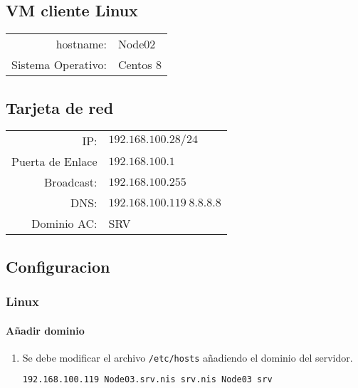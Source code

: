 \documentclass[../main.tex]{subfiles}
\begin{document}
\subsection{VM cliente Linux}\label{sec:cliente_vmlinux}
\begin{table}[htbp]
  \centering
  \begin{tabular}{rl}
    
    hostname:&Node02\\
    Sistema Operativo:&Centos 8\\
  \end{tabular}
\end{table}

\subsection{Tarjeta de red}\label{sec:ctr}
\begin{table}[htbp]
  \centering
  \begin{tabular}{rl}
    
    IP:&$192.168.100.28/24$\\
    Puerta de Enlace&$192.168.100.1$\\
    Broadcast:&$192.168.100.255$\\
    DNS:&$192.168.100.119\ 8.8.8.8$\\
    Dominio AC:&SRV\\
  \end{tabular}
\end{table}


\subsection{Configuracion}\label{sec:cliente_conf}

\subsubsection{Linux}\label{sec:cliente_linux}

\paragraph{Añadir dominio}
\begin{enumerate}
\item Se debe modificar el archivo \lstinline|/etc/hosts| añadiendo
  el dominio del servidor.

  \begin{lstlisting}[language=bash,label={list:hosts},caption=Modificación del archivo /etc/hosts]
192.168.100.119 Node03.srv.nis srv.nis Node03 srv
\end{lstlisting}
\end{enumerate}
\end{document}
